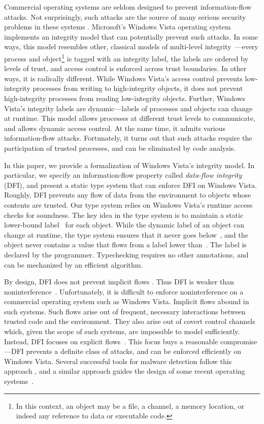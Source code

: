 \documentclass{sigplanconf}
\begin{document}
Commercial operating systems are seldom designed to prevent information-flow attacks. Not surprisingly, such attacks are the source of many serious security problems in these systems \cite{sabelfeld}. Microsoft's Windows Vista operating system implements an integrity model that can potentially prevent such attacks. In some ways, this model resembles other, classical models of multi-level integrity~\cite{biba}---every process and object\footnote{In this context, an object may be a file, a channel, a memory location, or indeed any reference to data or executable code.} 
 is tagged with an integrity label, the labels are ordered by levels of trust, and access control is enforced across trust boundaries. In other ways, it is radically different. While Windows Vista's access control prevents
low-integrity processes from writing to high-integrity objects, it does not prevent high-integrity processes from reading low-integrity objects.
Further, Windows Vista's integrity labels are
dynamic---labels of processes and objects can change at runtime. This model allows
processes at different trust levels to communicate, and allows dynamic access control. At the same time, it admits various information-flow attacks. Fortunately, it turns out that such attacks require the participation of trusted processes, and can be eliminated by code analysis.

In this paper, we provide a formalization of Windows Vista's integrity model. In particular, we specify an information-flow property called {\em data-flow integrity} (DFI), and present a static type
system that can enforce DFI on Windows Vista. Roughly, DFI prevents any flow of data from the environment to
objects whose contents are trusted. Our type system relies on Windows Vista's
runtime access checks for soundness. The
key idea in the type system is to 
maintain a static lower-bound label~ for each object. While the dynamic label of an object can change at runtime, the type system ensures that it
never goes below~, and the object never contains a value that
flows from a label lower than~.  The label  is
declared by the programmer. Typechecking requires no other annotations, and can be mechanized by an efficient algorithm.



By design, DFI does not prevent implicit flows \cite{denningcert}. Thus DFI is weaker than noninterference~\cite{nonintf}.
Unfortunately, it is difficult to enforce noninterference on a commercial operating system such as Windows Vista. Implicit flows abound in such systems. Such
flows arise out of frequent, necessary interactions between trusted code
and the environment. They also arise out of covert control channels
which, given the scope of such systems, are impossible to model
sufficiently. Instead, DFI focuses on explicit flows~\cite{denningcert}. This focus buys a reasonable compromise---DFI prevents a definite class of attacks, and can be enforced efficiently on Windows Vista. Several successful tools for malware detection follow this approach  \cite{castro,panorama,suh,vogt,dytan,perl}, and a similar approach guides the design of some recent operating systems~\cite{asbestos,histar}. 
\end{document}
